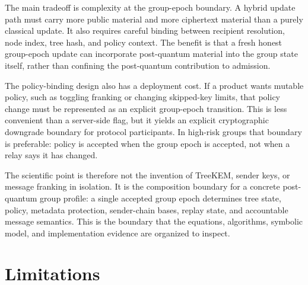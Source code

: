 \documentclass[preprint,12pt]{elsarticle}
\theoremstyle{definition}
\begin{document}
The main tradeoff is complexity at the group-epoch boundary. A hybrid update path
must carry more public material and more ciphertext material than a purely
classical update. It also requires careful binding between recipient
resolution, node index, tree hash, and policy context. The benefit is that a
fresh honest group-epoch update can incorporate post-quantum material into the group
state itself, rather than confining the post-quantum contribution to admission.

The policy-binding design also has a deployment cost. If a product wants
mutable policy, such as toggling franking or changing skipped-key limits, that
policy change must be represented as an explicit group-epoch transition. This is
less convenient than a server-side flag, but it yields an explicit
cryptographic downgrade boundary for protocol participants. In high-risk
groups that boundary is preferable: policy is accepted when the group epoch is
accepted, not when a relay says it has changed.

The scientific point is therefore not the invention of TreeKEM, sender keys, or
message franking in isolation. It is the composition boundary for a concrete
post-quantum group profile: a single accepted group epoch determines tree state,
policy, metadata protection, sender-chain bases, replay state, and accountable
message semantics. This is the boundary that the equations, algorithms,
symbolic model, and implementation evidence are organized to inspect.

\section{Limitations}
\end{document}
